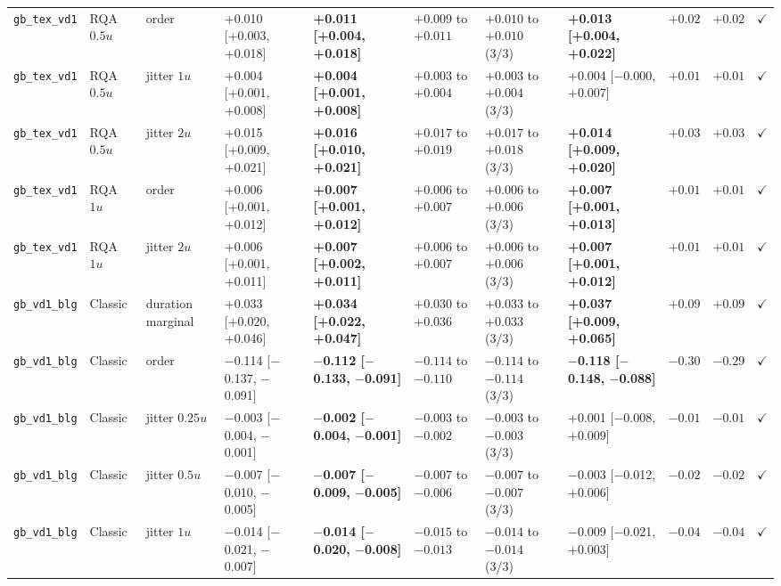 \begin{longtable}{lllllllllrc}
\texttt{gb\_tex\_vd1} & RQA $0.5u$ & order & +0.010 [+0.003, +0.018] & \textbf{+0.011 [+0.004, +0.018]} & $+0.009$ to $+0.011$ & $+0.010$ to $+0.010$ (3/3) & \textbf{+0.013 [+0.004, +0.022]} & $+0.02$ & $+0.02$ & $\checkmark$ \\
\texttt{gb\_tex\_vd1} & RQA $0.5u$ & jitter $1u$ & +0.004 [+0.001, +0.008] & \textbf{+0.004 [+0.001, +0.008]} & $+0.003$ to $+0.004$ & $+0.003$ to $+0.004$ (3/3) & +0.004 [$-$0.000, +0.007] & $+0.01$ & $+0.01$ & $\checkmark$ \\
\texttt{gb\_tex\_vd1} & RQA $0.5u$ & jitter $2u$ & +0.015 [+0.009, +0.021] & \textbf{+0.016 [+0.010, +0.021]} & $+0.017$ to $+0.019$ & $+0.017$ to $+0.018$ (3/3) & \textbf{+0.014 [+0.009, +0.020]} & $+0.03$ & $+0.03$ & $\checkmark$ \\
\texttt{gb\_tex\_vd1} & RQA $1u$ & order & +0.006 [+0.001, +0.012] & \textbf{+0.007 [+0.001, +0.012]} & $+0.006$ to $+0.007$ & $+0.006$ to $+0.006$ (3/3) & \textbf{+0.007 [+0.001, +0.013]} & $+0.01$ & $+0.01$ & $\checkmark$ \\
\texttt{gb\_tex\_vd1} & RQA $1u$ & jitter $2u$ & +0.006 [+0.001, +0.011] & \textbf{+0.007 [+0.002, +0.011]} & $+0.006$ to $+0.007$ & $+0.006$ to $+0.006$ (3/3) & \textbf{+0.007 [+0.001, +0.012]} & $+0.01$ & $+0.01$ & $\checkmark$ \\
\texttt{gb\_vd1\_blg} & Classic & duration marginal & +0.033 [+0.020, +0.046] & \textbf{+0.034 [+0.022, +0.047]} & $+0.030$ to $+0.036$ & $+0.033$ to $+0.033$ (3/3) & \textbf{+0.037 [+0.009, +0.065]} & $+0.09$ & $+0.09$ & $\checkmark$ \\
\texttt{gb\_vd1\_blg} & Classic & order & $-$0.114 [$-$0.137, $-$0.091] & \textbf{$-$0.112 [$-$0.133, $-$0.091]} & $-0.114$ to $-0.110$ & $-0.114$ to $-0.114$ (3/3) & \textbf{$-$0.118 [$-$0.148, $-$0.088]} & $-0.30$ & $-0.29$ & $\checkmark$ \\
\texttt{gb\_vd1\_blg} & Classic & jitter $0.25u$ & $-$0.003 [$-$0.004, $-$0.001] & \textbf{$-$0.002 [$-$0.004, $-$0.001]} & $-0.003$ to $-0.002$ & $-0.003$ to $-0.003$ (3/3) & +0.001 [$-$0.008, +0.009] & $-0.01$ & $-0.01$ & $\checkmark$ \\
\texttt{gb\_vd1\_blg} & Classic & jitter $0.5u$ & $-$0.007 [$-$0.010, $-$0.005] & \textbf{$-$0.007 [$-$0.009, $-$0.005]} & $-0.007$ to $-0.006$ & $-0.007$ to $-0.007$ (3/3) & $-$0.003 [$-$0.012, +0.006] & $-0.02$ & $-0.02$ & $\checkmark$ \\
\texttt{gb\_vd1\_blg} & Classic & jitter $1u$ & $-$0.014 [$-$0.021, $-$0.007] & \textbf{$-$0.014 [$-$0.020, $-$0.008]} & $-0.015$ to $-0.013$ & $-0.014$ to $-0.014$ (3/3) & $-$0.009 [$-$0.021, +0.003] & $-0.04$ & $-0.04$ & $\checkmark$ \\

\end{longtable}
